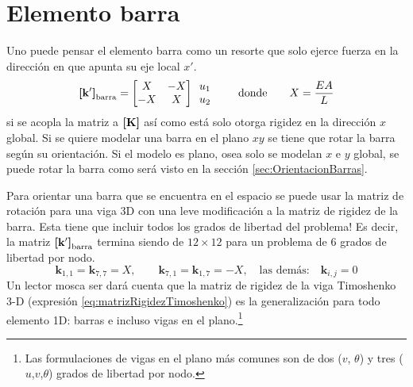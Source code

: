 \section{Elemento barra}
Uno puede pensar el elemento barra como un resorte que solo ejerce fuerza en la dirección en que apunta su eje local $x'$.
\begin{equation} \label{eq:matrizBarra}
\boldsymbol{[}\mathbf{k'} \boldsymbol{]}_{\mathrm{barra}} = \begin{bmatrix}
X & -X \\ 
-X & X\\
\end{bmatrix}\begin{array}{c}
u_1\\
u_2 
\end{array} \qquad \text{donde}\qquad X=\frac{EA}{L}
\end{equation}
si se acopla la matriz a $\boldsymbol{[}\mathbf{K} \boldsymbol{]}$ así como está solo otorga rigidez en la dirección $x$ global. Si se quiere modelar una barra en el plano $xy$ se tiene que rotar la barra según su orientación. Si el modelo es plano, osea solo se modelan $x$ e $y$ global, se puede rotar la barra como será visto en la sección \ref{sec:OrientacionBarras}. 

Para orientar una barra que se encuentra en el espacio se puede usar la matriz de rotación para una viga 3D con una leve modificación a la matriz de rigidez de la barra. Esta tiene que incluir todos los grados de libertad del problema! Es decir, la matriz $\boldsymbol{[}\mathbf{k'} \boldsymbol{]}_{\mathrm{barra}}$ termina siendo de $12 \times 12$ para un problema de 6 grados de libertad por nodo.
\[
\mathbf{k}_{1,1}=\mathbf{k}_{7,7}=X, \qquad \mathbf{k}_{7,1}=\mathbf{k}_{1,7}=-X, \quad \text{las demás:} \quad \mathbf{k}_{i,j} = 0
\]
Un lector mosca ser dará cuenta que la matriz de rigidez de la viga Timoshenko 3-D (expresión \ref{eq:matrizRigidezTimoshenko}) es la generalización para todo elemento 1D: barras e incluso vigas en el plano.\footnote{Las formulaciones de vigas en el plano más comunes son de dos ($v$, $\theta$) y tres ($u$,$v$,$\theta$) grados de libertad por nodo.}

